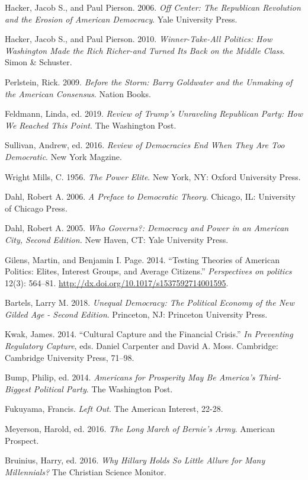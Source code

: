 \documentclass[11pt]{article}
\begin{document}
\begin{references}[Reference]
\item Hacker, Jacob S., and Paul Pierson. 2006. \textit{Off Center: The Republican Revolution and the Erosion of American Democracy}. Yale University Press.
\item Hacker, Jacob S., and Paul Pierson. 2010. \textit{Winner-Take-All Politics: How Washington Made the Rich Richer-and Turned Its Back on the Middle Class}. Simon \& Schuster.
\item Perlstein, Rick. 2009. \textit{Before the Storm: Barry Goldwater and the Unmaking of the American Consensus}. Nation Books.
\item Feldmann, Linda, ed. 2019. \textit{Review of Trump’s Unraveling Republican Party: How We Reached This Point}. The Washington Post.
\item Sullivan, Andrew, ed. 2016. \textit{Review of Democracies End When They Are Too Democratic}. New York Magzine.
\item Wright Mills, C. 1956. \textit{The Power Elite}. New York, NY: Oxford University Press.
\item Dahl, Robert A. 2006. \textit{A Preface to Democratic Theory}. Chicago, IL: University of Chicago Press.
\item Dahl, Robert A. 2005. \textit{Who Governs?: Democracy and Power in an American City, Second Edition.} New Haven, CT: Yale University Press.
\item Gilens, Martin, and Benjamin I. Page. 2014. “Testing Theories of American Politics: Elites, Interest Groups, and Average Citizens.” \textit{Perspectives on politics} 12(3): 564–81. \url{http://dx.doi.org/10.1017/s1537592714001595}.
\item Bartels, Larry M. 2018. \textit{Unequal Democracy: The Political Economy of the New Gilded Age - Second Edition}. Princeton, NJ: Princeton University Press.
\item Kwak, James. 2014. “Cultural Capture and the Financial Crisis.” \textit{In Preventing Regulatory Capture}, eds. Daniel Carpenter and David A. Moss. Cambridge: Cambridge University Press, 71–98.
\item Bump, Philip, ed. 2014. \textit{Americans for Prosperity May Be America’s Third-Biggest Political Party}. The Washington Post.
\item Fukuyama, Francis. \textit{Left Out}. The American Interest, 22-28.
\item Meyerson, Harold, ed. 2016. \textit{The Long March of Bernie’s Army}. American Prospect.
\item Bruinius, Harry, ed. 2016. \textit{Why Hillary Holds So Little Allure for Many Millennials?} The Christian Science Monitor.
\end{references}
\end{document}
